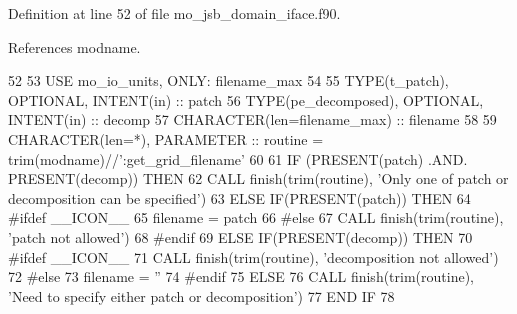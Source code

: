 Definition at line 52 of file mo\+\_\+jsb\+\_\+domain\+\_\+iface.\+f90.



References modname.


\begin{DoxyCode}
52 
53     \textcolor{keywordtype}{USE }mo\_io\_units\textcolor{keywordtype}{, ONLY}: filename\_max
54 
55     \textcolor{keywordtype}{TYPE}(t\_patch),       \textcolor{keywordtype}{OPTIONAL}, \textcolor{keywordtype}{INTENT(in)} :: patch
56     \textcolor{keywordtype}{TYPE}(pe\_decomposed), \textcolor{keywordtype}{OPTIONAL}, \textcolor{keywordtype}{INTENT(in)} :: decomp
57     \textcolor{keywordtype}{CHARACTER(len=filename\_max)}               :: filename
58 
59     \textcolor{keywordtype}{CHARACTER(len=*)}, \textcolor{keywordtype}{PARAMETER} :: routine = trim(modname)//\textcolor{stringliteral}{':get\_grid\_filename'}
60 
61     \textcolor{keywordflow}{IF} (\textcolor{keyword}{PRESENT}(patch) .AND. \textcolor{keyword}{PRESENT}(decomp)) \textcolor{keywordflow}{THEN}
62       \textcolor{keyword}{CALL }finish(trim(routine), \textcolor{stringliteral}{'Only one of patch or decomposition can be specified'})
63     \textcolor{keywordflow}{ELSE} \textcolor{keywordflow}{IF}(\textcolor{keyword}{PRESENT}(patch)) \textcolor{keywordflow}{THEN}
64 \textcolor{preprocessor}{#ifdef \_\_ICON\_\_}
65 \textcolor{preprocessor}{}      filename = patch%
66 \textcolor{preprocessor}{#else}
67 \textcolor{preprocessor}{}      \textcolor{keyword}{CALL }finish(trim(routine), \textcolor{stringliteral}{'patch not allowed'})
68 \textcolor{preprocessor}{#endif}
69 \textcolor{preprocessor}{}    \textcolor{keywordflow}{ELSE} \textcolor{keywordflow}{IF}(\textcolor{keyword}{PRESENT}(decomp)) \textcolor{keywordflow}{THEN}
70 \textcolor{preprocessor}{#ifdef \_\_ICON\_\_}
71 \textcolor{preprocessor}{}      \textcolor{keyword}{CALL }finish(trim(routine), \textcolor{stringliteral}{'decomposition not allowed'})
72 \textcolor{preprocessor}{#else}
73 \textcolor{preprocessor}{}      filename = \textcolor{stringliteral}{''}
74 \textcolor{preprocessor}{#endif}
75 \textcolor{preprocessor}{}    \textcolor{keywordflow}{ELSE}
76       \textcolor{keyword}{CALL }finish(trim(routine), \textcolor{stringliteral}{'Need to specify either patch or decomposition'})
77 \textcolor{keywordflow}{    END IF}
78 
\end{DoxyCode}
\hypertarget{namespacemo__jsb__domain__iface_a3d9e98bf333fe59aa4108a37ed0947d3}{}
